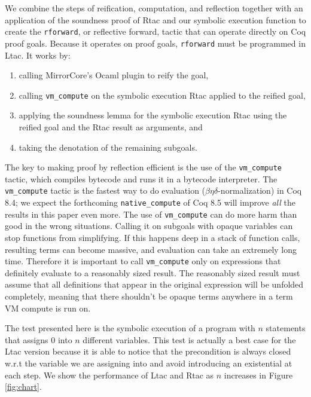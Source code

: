 \documentclass{puthesis}
\begin{document}
We combine the steps of reification, computation, and reflection
together with an application of the soundness proof of Rtac and our
symbolic execution function to create the \lstinline|rforward|, or
reflective forward, tactic that can operate directly on Coq proof
goals. Because it operates on proof goals, \lstinline|rforward| must
be programmed in Ltac.  It works by:
\begin{enumerate}
\item calling MirrorCore's Ocaml plugin to reify the goal,
\item calling \lstinline|vm_compute| on the symbolic execution Rtac
  applied to the reified goal,
\item applying the soundness lemma for the symbolic execution Rtac
  using the reified goal and the Rtac result as arguments, and
\item taking the denotation of the remaining subgoals.
\end{enumerate}
The key to making proof by reflection efficient is the use of the
\lstinline|vm_compute| tactic, which compiles bytecode and runs it in
a bytecode interpreter. The \lstinline|vm_compute| tactic is the
fastest way to do evaluation ($\beta\eta\delta$-normalization) in Coq
8.4; we expect the forthcoming \lstinline{native_compute} of Coq 8.5
will improve \emph{all} the results in this paper even more.  The use
of \lstinline|vm_compute| can do more harm than good in the wrong
situations. Calling it on subgoals with opaque variables can stop
functions from simplifying. If this happens deep in a stack of
function calls, resulting terms can become massive, and evaluation can
take an extremely long time. Therefore it is important to call
\lstinline|vm_compute| only on expressions that definitely evaluate to
a reasonably sized result. The reasonably sized result must assume
that all definitions that appear in the original expression will be
unfolded completely, meaning that there shouldn't be opaque terms
anywhere in a term VM compute is run on.
  
The test presented here is the symbolic execution of a program with
$n$ statements that assigns $0$ into $n$ different variables. This
test is actually a best case for the Ltac version because it is able
to notice that the precondition is always closed w.r.t the variable we
are assigning into and avoid introducing an existential at each
step. 
We show the performance of Ltac and
Rtac as $n$ increases in Figure \ref{fig:chart}.
\end{document}
